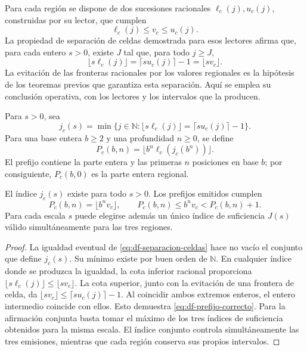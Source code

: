 Para cada región se dispone de dos sucesiones racionales
\(\ell_c(j),u_c(j)\), construidas por su lector, que cumplen
\[
 \ell_c(j)\leq v_c\leq u_c(j).
\]
La propiedad de separación de celdas demostrada para esos lectores afirma
que, para cada entero \(s>0\), existe \(J\) tal que, para todo \(j\geq J\),
\begin{equation}
 \lfloor s\ell_c(j)\rfloor
 =\lceil su_c(j)\rceil-1
 =\lfloor sv_c\rfloor.
 \label{eq:df-separacion-celdas}
\end{equation}
La evitación de las fronteras racionales por los valores regionales es la
hipótesis de los teoremas previos que garantiza esta separación. Aquí se
emplea su conclusión operativa, con los lectores y los intervalos que la
producen.

\begin{definition}
Para \(s>0\), sea
\[
 j_c(s)=\min\{j\in\mathbb N:
 \lfloor s\ell_c(j)\rfloor=\lceil su_c(j)\rceil-1\}.
\]
Para una base entera \(b\geq2\) y una profundidad \(n\geq0\), se define
\begin{equation}
 P_c(b,n)=\lfloor b^n\ell_c(j_c(b^n))\rfloor.
 \label{eq:df-publicacion-prefijo}
\end{equation}
El prefijo contiene la parte entera y las primeras \(n\) posiciones en base
\(b\); por consiguiente, \(P_c(b,0)\) es la parte entera regional.
\end{definition}

\begin{theorem}
\label{thm:df-emision-correcta}
El índice \(j_c(s)\) existe para todo \(s>0\). Los prefijos emitidos cumplen
\begin{equation}
 P_c(b,n)=\lfloor b^n v_c\rfloor,
 \qquad
 P_c(b,n)\leq b^n v_c<P_c(b,n)+1.
 \label{eq:df-prefijo-correcto}
\end{equation}
Para cada escala \(s\) puede elegirse además un único índice de suficiencia
\(J(s)\) válido simultáneamente para las tres regiones.
\end{theorem}

\begin{proof}
La igualdad eventual de \eqref{eq:df-separacion-celdas} hace no vacío el
conjunto que define \(j_c(s)\). Su mínimo existe por buen orden de
\(\mathbb N\). En cualquier índice donde se produzca la igualdad, la cota
inferior racional proporciona
\(\lfloor s\ell_c(j)\rfloor\leq\lfloor sv_c\rfloor\).
La cota superior, junto con la evitación de una frontera de celda, da
\(\lfloor sv_c\rfloor\leq\lceil su_c(j)\rceil-1\).
Al coincidir ambos extremos enteros, el entero intermedio coincide con
ellos. Esto demuestra \eqref{eq:df-prefijo-correcto}. Para la afirmación
conjunta basta tomar el máximo de los tres índices de suficiencia obtenidos
para la misma escala. El índice conjunto controla simultáneamente las tres
emisiones, mientras que cada región conserva sus propios intervalos.
\end{proof}

